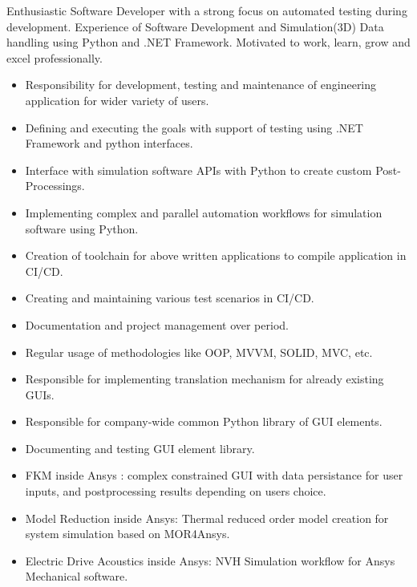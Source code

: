 \documentclass[10pt,a4paper,ragged2e,withhyper]{altacv}
\begin{document}
\begin{paracol}{2}

\begin{flushleft}
Enthusiastic Software Developer with a strong focus on automated testing during development.
Experience of Software Development and Simulation(3D) Data handling using Python and .NET Framework. 
Motivated to work, learn, grow and excel professionally.
\end{flushleft}

\begin{itemize}
\item Responsibility for development, testing and maintenance of engineering application for wider variety of users.
\item Defining and executing the goals with support of testing using .NET Framework and python interfaces.
\item Interface with simulation software APIs with Python to create custom Post-Processings.
\item Implementing complex and parallel automation  workflows for simulation software using Python.
\item Creation of toolchain for above written applications to  compile application in CI/CD.
\item Creating and maintaining various test scenarios in CI/CD.
\item Documentation and project management over period.
\item Regular usage of methodologies like OOP, MVVM, SOLID, MVC, etc.  
\end{itemize}
\divider
{}
\begin{itemize}
\item Responsible for implementing translation mechanism for already existing GUIs. 
\item Responsible for company-wide common Python library of GUI elements.
\item Documenting and testing GUI element library.
\end{itemize}
\divider

\begin{itemize}

\item FKM inside Ansys : complex constrained GUI with data persistance for user inputs, and postprocessing results depending on users choice. 
\item Model Reduction inside Ansys: Thermal reduced order model creation for system simulation based on MOR4Ansys.
\item Electric Drive Acoustics inside Ansys: NVH Simulation workflow for Ansys Mechanical software.
\end{itemize}


\end{paracol}
\end{document}
